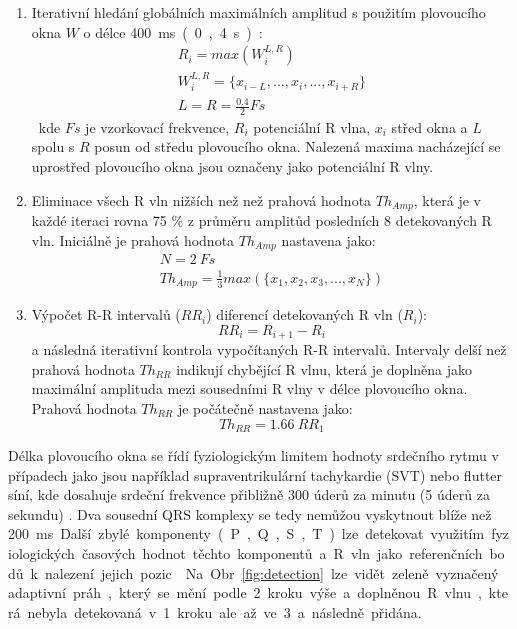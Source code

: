 \begin{enumerate}
    \item Iterativní hledání globálních maximálních amplitud s použitím
          plovoucího okna $W$ o délce 400~\si\ms~(0,4~\si\s):
          \begin{gather}
              R_i = max(W_i^{L,R}) \nonumber \\
              W_i^{L,R} = \{x_{i-L},...,x_i,...,x_{i+R}\} \nonumber \\
              L = R = \frac{0.4}{2} Fs
          \end{gather}
          kde $Fs$ je vzorkovací frekvence, $R_i$ potenciální R vlna, $x_i$
          střed okna a $L$ spolu s $R$ posun od středu plovoucího okna. Nalezená
          maxima nacházející se uprostřed plovoucího okna jsou označeny jako
          potenciální R vlny.
    \item Eliminace všech R vln nižších než než prahová hodnota $Th_{Amp}$, která je v
          každé iteraci rovna 75 \% z průměru amplitůd posledních 8 detekovaných
          R vln. Iniciálně je prahová hodnota $Th_{Amp}$ nastavena jako:
          \begin{gather}
              N = 2~Fs \nonumber \\
              Th_{Amp} = \frac{1}{3} max(\{x_1,x_2,x_3,...,x_N\})
          \end{gather}
    \item Výpočet R-R intervalů ($RR_i$) diferencí detekovaných R vln ($R_i$):
          \begin{equation}
              RR_i = R_{i+1} - R_i
          \end{equation}
          a následná iterativní kontrola vypočítaných R-R intervalů. Intervaly
          delší než prahová hodnota $Th_{RR}$ indikují chybějící R vlnu, která je
          doplněna jako maximální amplituda mezi sousedními R vlny v délce
          plovoucího okna. Prahová hodnota $Th_{RR}$ je počátečně nastavena jako:
          \begin{equation}
              Th_{RR} = 1.66~RR_1
          \end{equation}
\end{enumerate}

Délka plovoucího okna se řídí fyziologickým limitem hodnoty srdečního rytmu v
případech jako jsou například supraventrikulární tachykardie (SVT) nebo flutter
síní, kde dosahuje srdeční frekvence přibližně 300 úderů za minutu (5 úderů za
sekundu) \cite{Haberl2012,Goldberger2017}. Dva sousední QRS komplexy se tedy
nemůžou vyskytnout blíže než 200~\si\ms. Další zbylé komponenty (P, Q, S, T) lze
detekovat využitím fyziologických časových hodnot těchto komponentů a R vln jako
referenčních bodů k nalezení jejich pozic \cite{Nabian2018}. Na Obr.
\ref{fig:detection} lze vidět zeleně vyznačený adaptivní práh, který se mění podle
2. kroku výše a doplněnou R vlnu, která nebyla detekovaná v 1. kroku ale až ve
3. a následně přidána.

